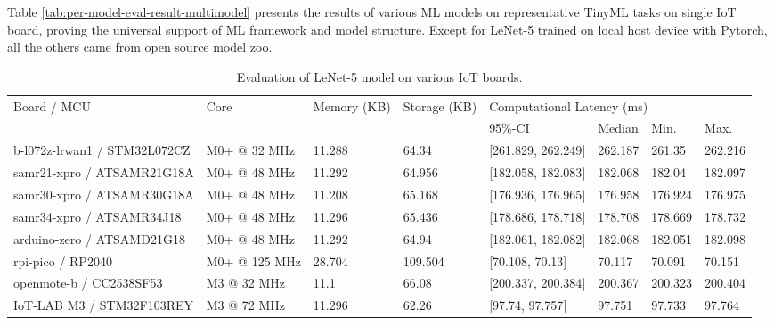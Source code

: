 Table \ref{tab:per-model-eval-result-multimodel} presents the results of various ML models on representative TinyML tasks on single IoT board, proving the universal support of ML framework and model structure. Except for LeNet-5 trained on local host device with Pytorch, all the others came from open source model zoo.
\begin{table}[ht]
\centering
\begin{threeparttable}
\caption{Evaluation of LeNet-5 model on various IoT boards.}
\label{tab:per-model-eval-result-multiboard}
\centering
\begin{tabular}{llllllll}
\hline
\multirow{2}{*}{Board   / MCU} & \multirow{2}{*}{Core} & \multirow{2}{*}{Memory (KB)} & \multirow{2}{*}{Storage (KB)} & \multicolumn{4}{l}{Computational Latency   (ms)}    \\ \cline{5-8} 
                               &                       &                              &                               & 95\%-CI               & Median  & Min.    & Max. \\\hline
b-l072z-lrwan1 / STM32L072CZ & M0+ @ 32 MHz          & 11.288                       & 64.34                         & {[}261.829, 262.249{]} & 262.187 & 261.35  & 262.216 \\
samr21-xpro / ATSAMR21G18A                   & M0+ @ 48 MHz          & 11.292                       & 64.956                        & {[}182.058, 182.083{]} & 182.068 & 182.04  & 182.097 \\
samr30-xpro / ATSAMR30G18A & M0+ @ 48 MHz          & 11.208                       & 65.168                        & {[}176.936, 176.965{]} & 176.958 & 176.924 & 176.975 \\
samr34-xpro / ATSAMR34J18   & M0+ @ 48 MHz          & 11.296                       & 65.436                        & {[}178.686, 178.718{]} & 178.708 & 178.669 & 178.732 \\
arduino-zero   / ATSAMD21G18        & M0+ @ 48 MHz          & 11.292                       & 64.94                         & {[}182.061, 182.082{]} & 182.068 & 182.051 & 182.098 \\
rpi-pico   / RP2040        & M0+ @ 125 MHz   &   28.704     &    109.504  &  [70.108, 70.13]  &   70.117  &   70.091 & 70.151 \\

openmote-b   / CC2538SF53          & M3 @ 32 MHz           & 11.1                         & 66.08                         & {[}200.337, 200.384{]} & 200.367 & 200.323 & 200.404 \\
IoT-LAB M3 / STM32F103REY    & M3 @ 72 MHz           & 11.296                       & 62.26                         & {[}97.74, 97.757{]}    & 97.751  & 97.733  & 97.764  \\


\end{tabular}
\end{threeparttable}
\end{table}
